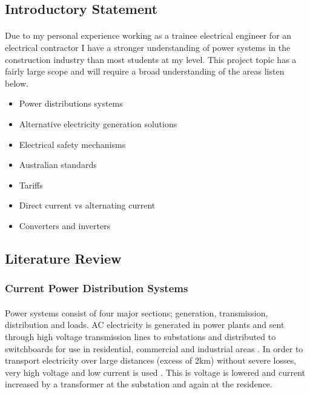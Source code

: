 \subsection{Introductory Statement}

\paragraph{} 
Due to my personal experience working as a trainee electrical engineer for an electrical contractor I have a stronger understanding of power systems in the construction industry than most students at my level. This project topic has a fairly large scope and will require a broad understanding of the areas listen below. 

\begin{itemize}
\itemsep-0.5em 
\item Power distributions systems
\item Alternative electricity generation solutions
\item Electrical safety mechanisms
\item Australian standards
\item Tariffs
\item Direct current vs alternating current
\item Converters and inverters
\end{itemize}


\subsection{Literature Review}

\subsubsection{Current Power Distribution Systems}

\paragraph{}
Power systems consist of four major sections; generation, transmission, distribution and loads. AC electricity is generated in power plants and sent through high voltage transmission lines to substations and distributed to switchboards for use in residential, commercial and industrial areas \cite{Amin2011}. In order to transport electricity over large distances (excess of 2km) without severe losses, very high voltage and low current is used \cite{Amin2011}. This is voltage is lowered and current increased by a transformer at the substation and again at the residence. 


